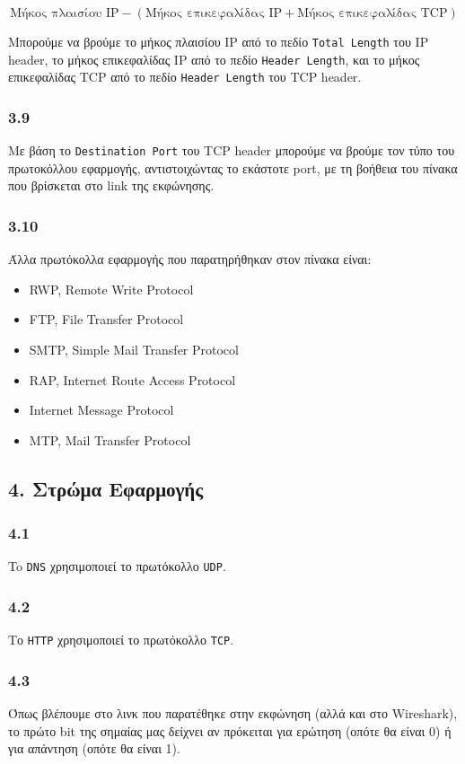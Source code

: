 			\[
				\text{Μήκος πλαισίου IP} - (\text{Μήκος επικεφαλίδας IP} + \text{Μήκος επικεφαλίδας TCP})
			\]
		
			Μπορούμε να βρούμε το μήκος πλαισίου IP από το πεδίο \verb|Total Length| του IP header, το μήκος επικεφαλίδας IP από το πεδίο \verb|Header Length|, και το μήκος επικεφαλίδας TCP από το πεδίο \verb|Header Length| του TCP header.

		\subsubsection*{3.9}
			Με βάση το \verb|Destination Port| του TCP header μπορούμε να βρούμε τον τύπο του πρωτοκόλλου εφαρμογής, αντιστοιχώντας το εκάστοτε port, με τη βοήθεια του πίνακα που βρίσκεται στο link της εκφώνησης.
		
		\subsubsection*{3.10}
			Άλλα πρωτόκολλα εφαρμογής που παρατηρήθηκαν στον πίνακα είναι:
			\begin{itemize}
				\item RWP, Remote Write Protocol
				\item FTP, File Transfer Protocol 
				\item SMTP, Simple Mail Transfer Protocol
				\item RAP, Internet Route Access Protocol
				\item Internet Message Protocol
				\item MTP, Mail Transfer Protocol
			\end{itemize}
	\subsection*{4. Στρώμα Εφαρμογής}
		
		\subsubsection*{4.1}
			To \verb|DNS| χρησιμοποιεί το πρωτόκολλο \verb|UDP|.
		
		\subsubsection*{4.2}
			Tο \verb|HTTP| χρησιμοποιεί το πρωτόκολλο \verb|TCP|.
			
		
		\subsubsection*{4.3}
			Όπως βλέπουμε στο λινκ που παρατέθηκε στην εκφώνηση (αλλά και στο Wireshark), το πρώτο bit της σημαίας μας δείχνει αν πρόκειται για ερώτηση (οπότε θα είναι 0) ή για απάντηση (οπότε θα είναι 1).
		
